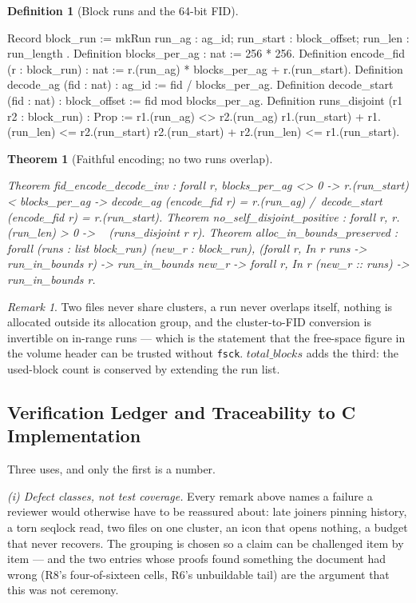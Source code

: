 \documentclass[10pt,journal,compsoc,twocolumn]{article}
\newtheorem{theorem}{Theorem}[section]
\theoremstyle{definition}
\newtheorem{definition}{Definition}[section]
\theoremstyle{remark}
\newtheorem{remark}{Remark}[section]
\theoremstyle{plain}
\newcommand{\ctr}[1]{\texttt{#1}}
\begin{document}
\begin{definition}[Block runs and the 64-bit FID]
\begin{coc}
Record block_run := mkRun { run_ag : ag_id; run_start : block_offset; run_len : run_length }.
Definition blocks_per_ag : nat := 256 * 256.
Definition encode_fid (r : block_run) : nat := r.(run_ag) * blocks_per_ag + r.(run_start).
Definition decode_ag (fid : nat) : ag_id := fid / blocks_per_ag.
Definition decode_start (fid : nat) : block_offset := fid mod blocks_per_ag.
Definition runs_disjoint (r1 r2 : block_run) : Prop :=
  r1.(run_ag) <> r2.(run_ag) \/
  r1.(run_start) + r1.(run_len) <= r2.(run_start) \/
  r2.(run_start) + r2.(run_len) <= r1.(run_start).
\end{coc}\end{definition}
\begin{theorem}[Faithful encoding; no two runs overlap]
\begin{coc}
Theorem fid_encode_decode_inv : forall r, blocks_per_ag <> 0 ->
  r.(run_start) < blocks_per_ag ->
  decode_ag (encode_fid r) = r.(run_ag) /\ decode_start (encode_fid r) = r.(run_start).
Theorem no_self_disjoint_positive : forall r, r.(run_len) > 0 -> ~ (runs_disjoint r r).
Theorem alloc_in_bounds_preserved : forall (runs : list block_run) (new_r : block_run),
  (forall r, In r runs -> run_in_bounds r) -> run_in_bounds new_r ->
  forall r, In r (new_r :: runs) -> run_in_bounds r.
\end{coc}\end{theorem}
\begin{remark}
Two files never share clusters, a run never overlaps itself, nothing is allocated
outside its allocation group, and the cluster-to-FID conversion is invertible on
in-range runs --- which is the statement that the free-space figure in the volume
header can be trusted without \ctr{fsck}. \(\mathit{total\_blocks}\) adds the
third: the used-block count is conserved by extending the run list.
\end{remark}

\subsection{Verification Ledger and Traceability to C Implementation}
\label{sec:acct:ledger}
Three uses, and only the first is a number.

\emph{(i) Defect classes, not test coverage.} Every remark above names a failure
a reviewer would otherwise have to be reassured about: late joiners pinning
history, a torn seqlock read, two files on one cluster, an icon that opens
nothing, a budget that never recovers. The grouping is chosen so a claim can be
challenged item by item --- and the two entries whose proofs found something the
document had wrong (R8's four-of-sixteen cells, R6's unbuildable tail) are the
argument that this was not ceremony.
\end{document}
